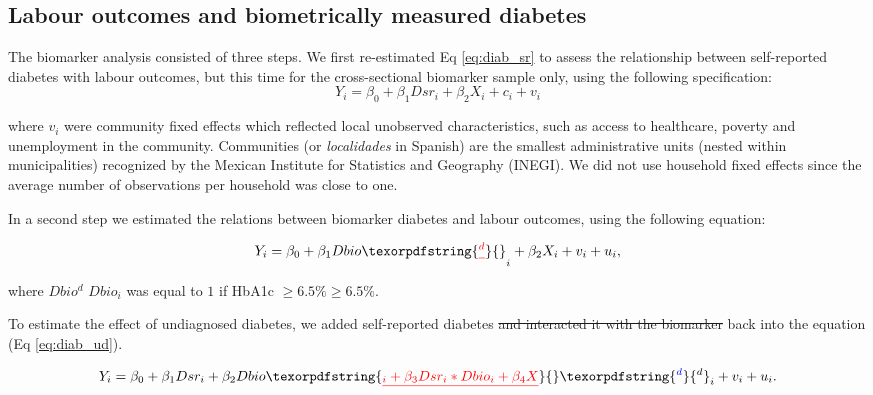 \documentclass[12pt,english]{article}
\providecommand{\DIFaddtex}[1]{{\protect\color{blue}#1}} %
\providecommand{\DIFdeltex}[1]{{\protect\color{red}\sout{#1}}}                      %
\providecommand{\DIFaddbegin}{} %
\providecommand{\DIFaddend}{} %
\providecommand{\DIFdelbegin}{} %
\providecommand{\DIFdelend}{} %
\providecommand{\DIFadd}[1]{\texorpdfstring{\DIFaddtex{#1}}{#1}} %
\providecommand{\DIFdel}[1]{\texorpdfstring{\DIFdeltex{#1}}{}} %
\begin{document}
\subsection{\label{sec:Biomarker Strategy}Labour outcomes and biometrically measured diabetes}

The biomarker analysis consisted of three steps. We first re-estimated Eq \ref{eq:diab_sr} to assess the relationship between self-reported diabetes with labour outcomes, but this time for the cross-sectional biomarker sample only, using the following specification:
\begin{equation}
Y_{i}=\beta_{0}+\beta_{1}Dsr_{i}+\beta_{2}X_{i}+c_{i}+v_{i}\label{eq:diab_sr}
\end{equation}

where $v_{i}$ were community fixed effects which reflected local unobserved characteristics, such as access to healthcare, poverty and unemployment in the community. \DIFaddbegin \DIFadd{Communities (or }\textit{\DIFadd{localidades}} \DIFadd{in Spanish) are the smallest administrative units (nested within municipalities) recognized by the Mexican Institute for Statistics and Geography (INEGI). }\DIFaddend We did not use household fixed effects since the average number of observations per household was close to one.

In a second step we estimated the relations between biomarker diabetes and labour outcomes, using the following equation:

\begin{equation}
Y_{i}=\beta_{0}+\beta_{1}Dbio\DIFdelbegin \DIFdel{^{d}}\DIFdelend _{i}+\beta_{2}X_{i}+v_{i}+u_{i}\label{eq:diab},
\end{equation}

where \DIFdelbegin \DIFdel{$Dbio^{d}$ }\DIFdelend \DIFaddbegin \DIFadd{$Dbio_{i}$ }\DIFaddend was equal to $1$ if \ac{HbA1c} \DIFdelbegin \DIFdel{$\geq6.5\%$}\DIFdelend \DIFaddbegin \DIFadd{$\geq 6.5\%$}\DIFaddend .

To estimate the effect of undiagnosed diabetes, we added self-reported diabetes \DIFdelbegin \DIFdel{and interacted it with the biomarker }\DIFdelend \DIFaddbegin \DIFadd{back into the equation }\DIFaddend (Eq \ref{eq:diab_ud}).

\begin{equation}
Y_{i}=\beta_{0}+\beta_{1}Dsr_{i}+\beta_{2}Dbio\DIFdelbegin \DIFdel{_{i}+\beta_{3}Dsr_{i}*Dbio_{i}+\beta_{4}X}\DIFdelend \DIFaddbegin \DIFadd{^{d}}\DIFaddend _{i}+v_{i}+u_{i}.\label{eq:diab_ud}
\end{equation}
\end{document}
